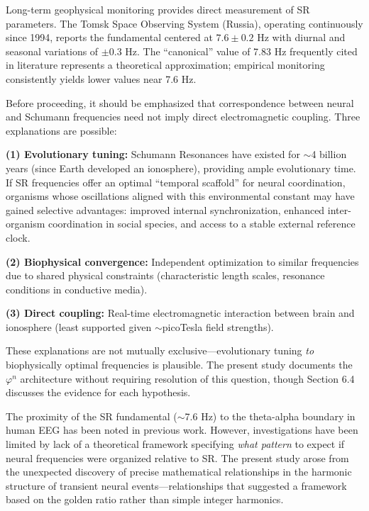 \documentclass[11pt,a4paper]{article}
\newcommand{\phisym}{\varphi}
\begin{document}
Long-term geophysical monitoring provides direct measurement of SR parameters. The Tomsk Space Observing System (Russia), operating continuously since 1994, reports the fundamental centered at $7.6 \pm 0.2$ Hz with diurnal and seasonal variations of $\pm 0.3$ Hz. The ``canonical'' value of 7.83 Hz frequently cited in literature represents a theoretical approximation; empirical monitoring consistently yields lower values near 7.6 Hz.

\begin{criticalpoint}
Before proceeding, it should be emphasized that correspondence between neural and Schumann frequencies need not imply direct electromagnetic coupling. Three explanations are possible:

\textbf{(1) Evolutionary tuning:} Schumann Resonances have existed for $\sim$4 billion years (since Earth developed an ionosphere), providing ample evolutionary time. If SR frequencies offer an optimal ``temporal scaffold'' for neural coordination, organisms whose oscillations aligned with this environmental constant may have gained selective advantages: improved internal synchronization, enhanced inter-organism coordination in social species, and access to a stable external reference clock.

\textbf{(2) Biophysical convergence:} Independent optimization to similar frequencies due to shared physical constraints (characteristic length scales, resonance conditions in conductive media).

\textbf{(3) Direct coupling:} Real-time electromagnetic interaction between brain and ionosphere (least supported given $\sim$picoTesla field strengths).

These explanations are not mutually exclusive---evolutionary tuning \textit{to} biophysically optimal frequencies is plausible. The present study documents the $\phisym^n$ architecture without requiring resolution of this question, though Section 6.4 discusses the evidence for each hypothesis.
\end{criticalpoint}

The proximity of the SR fundamental ($\sim$7.6 Hz) to the theta-alpha boundary in human EEG has been noted in previous work. However, investigations have been limited by lack of a theoretical framework specifying \textit{what pattern} to expect if neural frequencies were organized relative to SR. The present study arose from the unexpected discovery of precise mathematical relationships in the harmonic structure of transient neural events---relationships that suggested a framework based on the golden ratio rather than simple integer harmonics.
\end{document}
